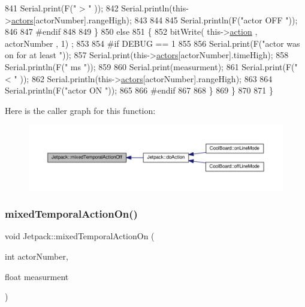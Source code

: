 \begin{DoxyCode}
841             Serial.print(F(\textcolor{stringliteral}{" > "} ));
842             Serial.println(this->\hyperlink{class_jetpack_a7e16d2f97837f9712a2e6de1c50d99db}{actors}[actorNumber].rangeHigh);
843 
844             
845             Serial.println(F(\textcolor{stringliteral}{"actor OFF "}));
846 
847 \textcolor{preprocessor}{        #endif}
848 
849         \}
850         \textcolor{keywordflow}{else} 
851         \{
852             bitWrite( this->\hyperlink{class_jetpack_aca3142925a7b0834b34ae91d26af7765}{action} , actorNumber , 1) ;
853 
854 \textcolor{preprocessor}{        #if DEBUG == 1 }
855             
856             Serial.print(F(\textcolor{stringliteral}{"actor was on for at least "}));
857             Serial.print(this->\hyperlink{class_jetpack_a7e16d2f97837f9712a2e6de1c50d99db}{actors}[actorNumber].timeHigh);
858             Serial.println(F(\textcolor{stringliteral}{" ms "}));
859 
860             Serial.print(measurment);
861             Serial.print(F(\textcolor{stringliteral}{" < "} ));
862             Serial.println(this->\hyperlink{class_jetpack_a7e16d2f97837f9712a2e6de1c50d99db}{actors}[actorNumber].rangeHigh);
863 
864             Serial.println(F(\textcolor{stringliteral}{"actor ON "}));
865 
866 \textcolor{preprocessor}{        #endif              }
867 
868         \}           
869     \}
870 
871 \}
\end{DoxyCode}
Here is the caller graph for this function\+:
\nopagebreak
\begin{figure}[H]
\begin{center}
\leavevmode
\includegraphics[width=350pt]{df/d1d/class_jetpack_af2f567ef6311a8fc2f7bb948837667b7_icgraph}
\end{center}
\end{figure}
\mbox{\label{class_jetpack_af44bc8a08818e4433dfb1c7104601f12}} 
\subsubsection{\texorpdfstring{mixed\+Temporal\+Action\+On()}{mixedTemporalActionOn()}}
{\footnotesize\ttfamily void Jetpack\+::mixed\+Temporal\+Action\+On (\begin{DoxyParamCaption}\item[{int}]{actor\+Number,  }\item[{float}]{measurment }\end{DoxyParamCaption})}

